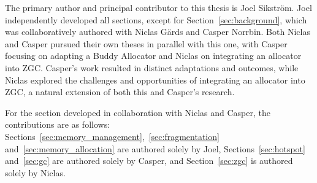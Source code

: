 
The primary author and principal contributor to this thesis is Joel Sikström. Joel independently developed all sections, except for Section~\ref{sec:background}, which was collaboratively authored with Niclas Gärds and Casper Norrbin. Both Niclas and Casper pursued their own theses in parallel with this one, with Casper focusing on adapting a Buddy Allocator and Niclas on integrating an allocator into ZGC. Casper's work resulted in distinct adaptations and outcomes, while Niclas explored the challenges and opportunities of integrating an allocator into ZGC, a natural extension of both this and Casper's research.

For the section developed in collaboration with Niclas and Casper, the contributions are as follows: Sections~\ref{sec:memory_management},~\ref{sec:fragmentation} and~\ref{sec:memory_allocation} are authored solely by Joel, Sections~\ref{sec:hotspot} and~\ref{sec:gc} are authored solely by Casper, and Section~\ref{sec:zgc} is authored solely by Niclas.

